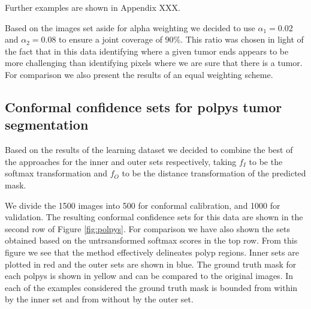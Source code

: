 Further examples are shown in Appendix XXX. 

Based on the images set aside for alpha weighting we decided to use $\alpha_1 = 0.02$ and $\alpha_2 = 0.08$ to ensure a joint coverage of $90\%$. This ratio was chosen in light of the fact that in this data identifying where a given tumor ends appears to be more challenging than identifying pixels where we are sure that there is a tumor. For comparison we also present the results of an equal weighting scheme.


\subsection{Conformal confidence sets for polpys tumor segmentation}
Based on the results of the learning dataset we decided to combine the best of the approaches for the inner and outer sets respectively, taking $f_I$ to be the softmax transformation and $f_O$ to be the distance transformation of the predicted mask.

We divide the 1500 images into 500 for conformal calibration, and 1000 for validation. The resulting conformal confidence sets for this data are shown in the second row of Figure \ref{fig:polpys}. For comparison we have also shown the sets obtained based on the untrsansformed softmax scores in the top row. From this figure we see that the method effectively delineates polyp regions. Inner sets are plotted in red and the outer sets are shown in blue. The ground truth mask for each polpys is shown in yellow and can be compared to the original images. In each of the examples considered the ground truth mask is bounded from within by the inner set and from without by the outer set. 

